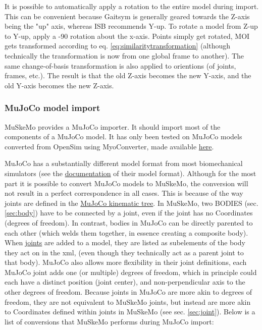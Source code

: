 \documentclass{article}
\begin{document}
It is possible to automatically apply a rotation to the entire model during import. This can be convenient because Gaitsym is generally geared towards the Z-axis being the "up" axis, whereas ISB recommends Y-up. To rotate a model from Z-up to Y-up, apply a -90 \degree rotation about the x-axis. Points simply get rotated, MOI gets transformed according to eq. \ref{eq:similaritytransformation} (although technically the transformation is now from one global frame to another). The same change-of-basis transformation is also applied to orientions (of joints, frames, etc.). The result is that the old Z-axis becomes the new Y-axis, and the old Y-axis becomes the new Z-axis.


\subsubsection{MuJoCo model import}
\label{sec:mujocoimporter}
MuSkeMo provides a MuJoCo importer. It should import most of the components of a MuJoCo model. It has only been tested on MuJoCo models converted from OpenSim using MyoConverter, made available \href{https://github.com/MyoHub/myoconverter/tree/main}{here}.

MuJoCo has a substantially different model format from most biomechanical simulators (see the \href{https://mujoco.readthedocs.io/en/stable/XMLreference.html}{documentation} of their model format). Although for the most part it is possible to convert MuJoCo models to MuSkeMo, the conversion will not result in a perfect correspondence in all cases. This is because of the way joints are defined in the \href{https://mujoco.readthedocs.io/en/stable/modeling.html#ctree}{MuJoCo kinematic tree}. In MuSkeMo, two BODIES (sec. \ref{sec:body}) have to be connected by a joint, even if the joint has no Coordinates (degrees of freedom). In contrast, bodies in MuJoCo can be directly parented to each other (which welds them together, in essence creating a composite body). When \href{https://mujoco.readthedocs.io/en/stable/XMLreference.html#body-joint}{joints} are added to a model, they are listed as subelements of the body they act on in the xml, (even though they technically act as a parent joint to that body). MuJoCo also allows more flexibility in their joint definitions, each MuJoCo joint adds one (or multiple) degrees of freedom, which in principle could each have a distinct position (joint center), and non-perpendicular axis to the other degrees of freedom. Because joints in MuJoCo are more akin to degrees of freedom, they are not equivalent to MuSkeMo joints, but instead are more akin to Coordinates defined within joints in MuSkeMo (see sec. \ref{sec:joint}). Below is a list of conversions that MuSkeMo performs during MuJoCo import:
\end{document}
